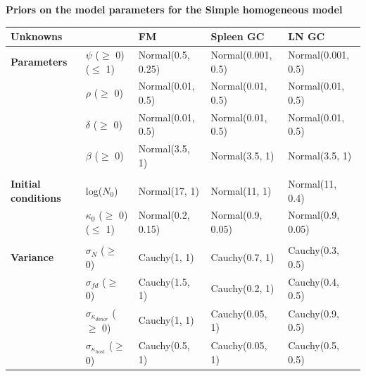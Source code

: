 \documentclass[11pt]{article}
\begin{document}
\begin{table}[h!]
	\begin{center}
	\textbf{Priors on the model parameters for the Simple homogeneous model}\\
		\renewcommand{\arraystretch}{1.2}
		\begin{tabular}{l l l l l } 
			\toprule 
			\textbf{Unknowns}              &                                     & \textbf{FM}           & \textbf{Spleen GC}        &  \textbf{LN GC}        \\ 
			\toprule
			\textbf{Parameters}            &$\psi$ ($\ge$ 0) ($\le$ 1)           & Normal(0.5, 0.25)     & Normal(0.001, 0.5)   &  Normal(0.001, 0.5)   \\ 			                               
			                               &$\rho$ ($\ge$ 0)                     & Normal(0.01, 0.5)     & Normal(0.01, 0.5)    &  Normal(0.01, 0.5)    \\
			                               &$\delta$ ($\ge$ 0)                   & Normal(0.01, 0.5)     & Normal(0.01, 0.5)    &  Normal(0.01, 0.5)    \\
			                               &$\beta$ ($\ge$ 0)                    & Normal(3.5, 1)        & Normal(3.5, 1)       &  Normal(3.5, 1) \\
			                               &&&&\\
			\textbf{Initial conditions}    &log($N_0$)                           & Normal(17, 1)         & Normal(11, 1)        &  Normal(11, 0.4)      \\			                               
			                               &$\kappa_0$ ($\ge$ 0) ($\le$ 1)       & Normal(0.2, 0.15)     & Normal(0.9, 0.05)    &  Normal(0.9, 0.05)    \\
			                               &&&&\\
			\textbf{Variance}              &$\sigma_N$ ($\ge$ 0)                 & Cauchy(1, 1)          & Cauchy(0.7, 1)       &  Cauchy(0.3, 0.5)     \\ 
		                               	   &$\sigma_{fd}$ ($\ge$ 0)              & Cauchy(1.5, 1)        & Cauchy(0.2, 1)       &  Cauchy(0.4, 0.5)     \\
			                               &$\sigma_{\kappa_{donor}}$ ($\ge$ 0)  & Cauchy(1, 1)          & Cauchy(0.05, 1)      &  Cauchy(0.9, 0.5)     \\ 
			                               &$\sigma_{\kappa_{host}}$ ($\ge$ 0)   & Cauchy(0.5, 1)        & Cauchy(0.05, 1)      &  Cauchy(0.5, 0.5)     \\
			\hline
			\toprule 
		\end{tabular}
	\end{center}
	\label{tab:priors_cbdm}
\end{table} 
\end{document}
